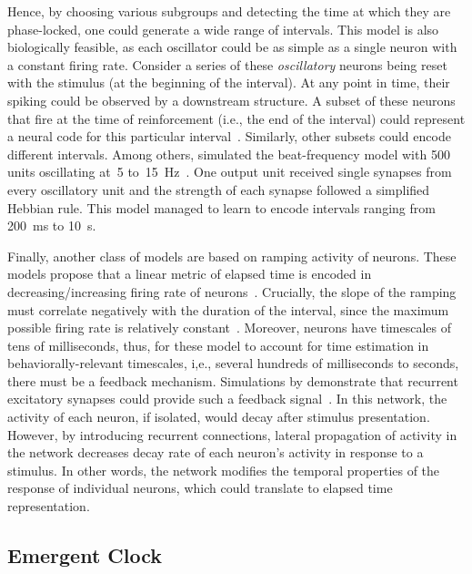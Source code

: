 Hence, by choosing various subgroups and detecting the time at which they are phase-locked, one could generate a wide range of intervals.
This model is also biologically feasible, as each oscillator could be as simple as a single neuron with a constant firing rate.
Consider a series of these \textit{oscillatory} neurons being reset with the stimulus (at the beginning of the interval).
At any point in time, their spiking could be observed by a downstream structure.
A subset of these neurons that fire at the time of reinforcement (i.e., the end of the interval) could represent a neural code for this particular interval~\cite{Matell2004CogBrainRes}.
Similarly, other subsets could encode different intervals.
Among others,  simulated the beat-frequency model with 500 units oscillating at~5 to~15~Hz~\cite{Miali1989NeuComp}.
One output unit received single synapses from every oscillatory unit and the strength of each synapse followed a simplified Hebbian rule.
This model managed to learn to encode intervals ranging from 200~ms to 10~s.
\par
Finally, another class of models are based on ramping activity of neurons.
These models propose that a linear metric of elapsed time is encoded in decreasing/increasing firing rate of neurons~\cite{Paton2018NeuronRev}.
Crucially, the slope of the ramping must correlate negatively with the duration of the interval, since the maximum possible firing rate is relatively constant~\cite{Jazayeri2015CurrBiol}.
Moreover, neurons have timescales of tens of milliseconds, thus, for these model to account for time estimation in behaviorally-relevant timescales, i,e., several hundreds of milliseconds to seconds, there must be a feedback mechanism.
Simulations by \citeauthor{Gavornik20009PNAS} demonstrate that recurrent excitatory synapses could provide such a feedback signal~\cite{Gavornik20009PNAS}.
In this network, the activity of each neuron, if isolated, would decay after stimulus presentation.
However, by introducing recurrent connections, lateral propagation of activity in the network decreases decay rate of each neuron's activity in response to a stimulus.
In other words, the network modifies the temporal properties of the response of individual neurons, which could translate to elapsed time representation.

\subsection{Emergent Clock}
\label{ch:intro:InternalTimeEstimation:Emergent}

